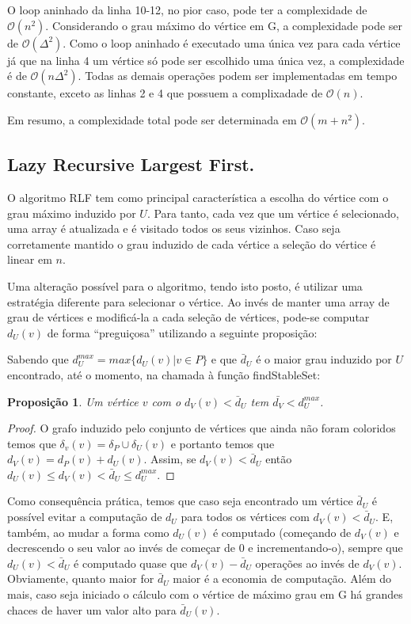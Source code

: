 \documentclass[a4paper,12pt]{article}
\newtheorem{lazy}{Proposição}
\begin{document}
O loop aninhado da linha 10-12, no pior caso, pode ter a complexidade de $\mathcal{O}(n^2)$. Considerando o grau máximo do vértice em G, a complexidade pode ser de $\mathcal{O}(\Delta^2)$. Como o loop aninhado é executado uma única vez para cada vértice já que na linha 4 um vértice só pode ser escolhido uma única vez, a complexidade é de $\mathcal{O}(n\Delta^2)$. Todas as demais operações podem ser implementadas em tempo constante, exceto as linhas 2 e 4 que possuem a complixadade de $\mathcal{O}(n)$.

Em resumo, a complexidade total pode ser determinada em $\mathcal{O}(m + n^2)$.

\subsection{Lazy Recursive Largest First.}

O algoritmo RLF tem como principal característica a escolha do vértice com o grau máximo induzido por $U$. Para tanto, cada vez que um vértice é selecionado, uma array é atualizada e é visitado todos os seus vizinhos. Caso seja corretamente mantido o grau induzido de cada vértice a seleção do vértice é linear em $n$.

Uma alteração possível para o algoritmo, tendo isto posto, é utilizar uma estratégia diferente para selecionar o vértice. Ao invés de manter uma array de grau de vértices e modificá-la a cada seleção de vértices, pode-se computar $d_U(v)$ de forma ``preguiçosa'' utilizando a seguinte proposição:

Sabendo que $d_U^{max} = max\{d_U(v) | v \in P\}$ e que $\bar{d}_U$ é o maior grau induzido por $U$ encontrado, até o momento, na chamada à função findStableSet:
\begin{lazy}
  Um vértice $v$ com o $d_V(v) < \bar{d}_U$ tem $\bar{d_V} < d_U^{max}$.
\end{lazy}

\begin{proof}
  O grafo induzido pelo conjunto de vértices que ainda não foram coloridos temos que $\delta_v(v) = \delta_P \cup \delta_U(v)$ e portanto temos que $d_V(v) = d_P(v) + d_U(v)$. Assim, se $d_V(v) < \bar{d}_U$ então $d_U(v) \leq d_V(v) < \bar{d}_U \leq d_U^{max}$.
\end{proof}

Como consequência prática, temos que caso seja encontrado um vértice $\bar{d}_U$ é possível evitar a computação de  $d_U$ para todos os vértices com $d_V(v) < \bar{d}_U$. E, também, ao mudar a forma como $d_U(v)$ é computado (começando de $d_V(v)$ e decrescendo o seu valor ao invés de começar de 0 e incrementando-o), sempre que $d_U(v) < \bar{d}_U$ é computado quase que $d_V(v) - \bar{d}_U$ operações ao invés de $d_V(v)$.
Obviamente, quanto maior for $\bar{d}_U$ maior é a economia de computação. Além do mais, caso seja iniciado o cálculo com o vértice de máximo grau em G há grandes chaces de haver um valor alto para $\bar{d}_U(v)$.
\end{document}
